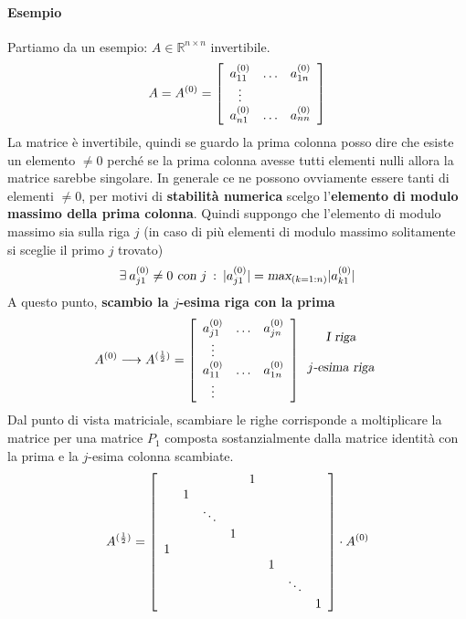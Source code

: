 \documentclass[10pt]{book}
\begin{document}
\paragraph{Esempio} Partiamo da un esempio: $A \in \mathbb{R}^{n \times n}$ invertibile.
$$A = A^{(0)} = \left[
\begin{array}{c c c}
a_{11}^{(0)} & \ldots & a_{1n}^{(0)} \\
\vdots \\
a_{n1}^{(0)} & \ldots & a_{nn}^{(0)}
\end{array}
\right]$$
La matrice è invertibile, quindi se guardo la prima colonna posso dire che esiste un elemento $\neq 0$ perché se la prima colonna avesse tutti elementi nulli allora la matrice sarebbe singolare. In generale ce ne possono ovviamente essere tanti di elementi $\neq 0$, per motivi di \textbf{stabilità numerica} scelgo l'\textbf{elemento di modulo massimo della prima colonna}. Quindi suppongo che l'elemento di modulo massimo sia sulla riga $j$ (in caso di più elementi di modulo massimo solitamente si sceglie il primo $j$ trovato)
$$\exists\: a_{j1}^{(0)} \neq 0\textsl{ con }j\: : \:|a_{j1}^{(0)}| = \textsl{max}_{(k = 1:n)}|a_{k1}^{(0)}|$$
A questo punto, \textbf{scambio la $j$-esima riga con la prima}
$$A^{(0)} \longrightarrow A^{(\frac{1}{2})} = \left[
\begin{array}{c c c}
a_{j1}^{(0)} & \ldots & a_{jn}^{(0)} \\
\vdots \\
a_{11}^{(0)} & \ldots & a_{1n}^{(0)} \\
\vdots
\end{array}
\right]
\begin{array}{c}
\textsl{I riga}\\
\\
j\textsl{-esima riga}\\
\\
\end{array}$$
Dal punto di vista matriciale, scambiare le righe corrisponde a moltiplicare la matrice per una matrice $P_1$ composta sostanzialmente dalla matrice identità con la prima e la $j$-esima colonna scambiate.
$$A^{(\frac{1}{2})} = \left[
\begin{array}{c c c c c c c c}
 & & & & 1 & & & \\
 & 1 & & & & & & \\
 & & \ddots\\
 & & & 1\\
 1 \\
 & & & & & 1 \\
 & & & & & & \ddots\\
 & & & & & & & 1
\end{array}
\right]\cdot A^{(0)}$$
\end{document}
